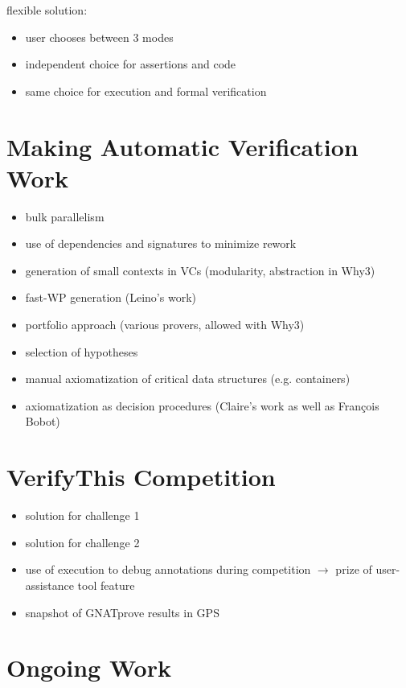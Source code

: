 \documentclass[sttt,draft]{svjour}
\begin{document}
flexible solution:
\begin{itemize}
\item user chooses between 3 modes
\item independent choice for assertions and code
\item same choice for execution and formal verification
\end{itemize}

\section{Making Automatic Verification Work}

\begin{itemize}
\item bulk parallelism
\item use of dependencies and signatures to minimize rework
\item generation of small contexts in VCs (modularity, abstraction in Why3)
\item fast-WP generation (Leino's work)
\item portfolio approach (various provers, allowed with Why3)
\item selection of hypotheses
\item manual axiomatization of critical data structures (e.g. containers)
\item axiomatization as decision procedures (Claire's work as well as François
  Bobot)
\end{itemize}

\section{VerifyThis Competition}

\begin{itemize}
\item solution for challenge 1
\item solution for challenge 2
\item use of execution to debug annotations during competition $\rightarrow$
  prize of user-assistance tool feature
\item snapshot of GNATprove results in GPS
\end{itemize}

\section{Ongoing Work}
\end{document}
